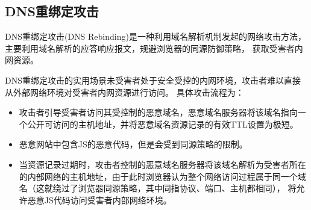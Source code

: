 \subsection{DNS重绑定攻击}

DNS重绑定攻击(DNS Rebinding)是一种利用域名解析机制发起的网络攻击方法，主要利用域名解析的应答响应报文，规避浏览器的同源防御策略，
获取受害者内网资源。

DNS重绑定攻击的实用场景未受害者处于安全受控的内网环境，攻击者难以直接从外部网络环境对受害者内网资源进行访问。
具体攻击流程为：
\begin{itemize}
    \item 攻击者引导受害者访问其受控制的恶意域名，恶意域名服务器将该域名指向一个公开可访问的主机地址，并将恶意域名资源记录的有效TTL设置为极短。
    \item 恶意网站中包含JS的恶意代码，但是会受到同源策略的限制。
    \item 当资源记录过期时，攻击者控制的恶意域名服务器将该域名解析为受害者所在的内部网络的主机地址，由于此时浏览器认为整个网络访问过程属于同一个域名（这就绕过了浏览器同源策略，其中同指协议、端口、主机都相同），
    将允许恶意JS代码访问受害者内部网络环境。
\end{itemize}